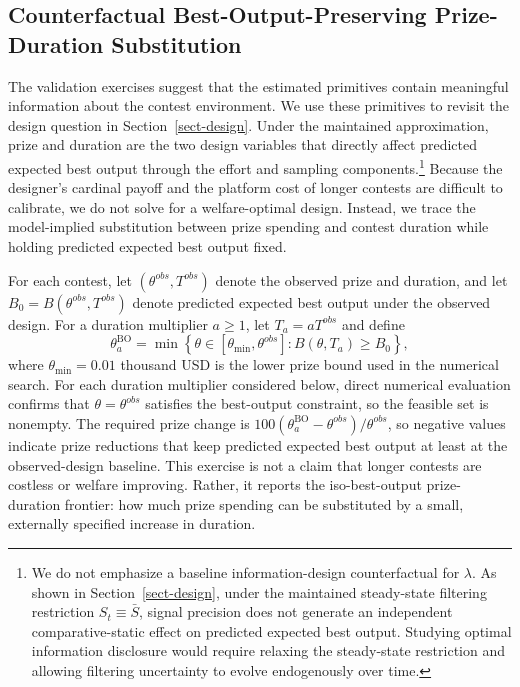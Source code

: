 \documentclass[mnsc]{informs3}
\begin{document}
\subsection{Counterfactual Best-Output-Preserving Prize-Duration Substitution}

The validation exercises suggest that the estimated primitives contain
meaningful information about the contest environment. We use these primitives to
revisit the design question in Section~\ref{sect-design}. Under the maintained
approximation, prize and duration are the two design variables that directly
affect predicted expected best output through the effort and sampling components.\footnote{
We do not emphasize a baseline information-design counterfactual for
$\lambda$. As shown in Section~\ref{sect-design}, under the maintained
steady-state filtering restriction $S_t\equiv\bar S$, signal precision does not
generate an independent comparative-static effect on predicted expected best output.
Studying optimal information disclosure would require relaxing the steady-state
restriction and allowing filtering uncertainty to evolve endogenously over time.
}
Because the designer's cardinal payoff and the platform cost of longer contests
are difficult to calibrate, we do not solve for a welfare-optimal design.
Instead, we trace the model-implied substitution between prize spending and
contest duration while holding predicted expected best output fixed.

For each contest, let $(\theta^{obs},T^{obs})$ denote the observed prize and
duration, and let
$B_0=B(\theta^{obs},T^{obs})$ denote predicted expected best output under the observed
design. For a duration multiplier $a\geq1$, let $T_a=aT^{obs}$ and define
\[
\theta_a^{\mathrm{BO}}
=
\min\left\{
\theta\in[\theta_{\min},\theta^{obs}]
:
B(\theta,T_a)\geq B_0
\right\},
\]
where $\theta_{\min}=0.01$ thousand USD is the lower prize bound used in the numerical search. For each duration multiplier considered below, direct numerical evaluation confirms that $\theta=\theta^{obs}$ satisfies the best-output constraint, so the feasible set is nonempty.
The required prize change is
$100(\theta_a^{\mathrm{BO}}-\theta^{obs})/\theta^{obs}$, so negative values indicate prize
reductions that keep predicted expected best output at least at the observed-design
baseline. This exercise is not a claim that longer contests are costless or
welfare improving. Rather, it reports the iso-best-output prize-duration frontier:
how much prize spending can be substituted by a small, externally specified increase in duration.
\end{document}
